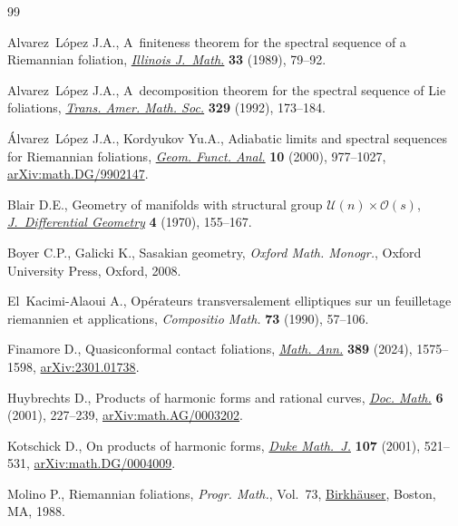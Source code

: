 \begin{thebibliography}{99}
\footnotesize\itemsep=0pt

Alvarez~L\'opez J.A., A~finiteness theorem for the spectral sequence of a
 {R}iemannian foliation,
 \href{https://doi.org/10.1215/ijm/1255988806}{\textit{Illinois J.~Math.}}
 \textbf{33} (1989), 79--92.

Alvarez~L\'opez J.A., A~decomposition theorem for the spectral sequence of
 {L}ie foliations, \href{https://doi.org/10.2307/2154083}{\textit{Trans. Amer.
 Math. Soc.}} \textbf{329} (1992), 173--184.

\'Alvarez~L\'opez J.A., Kordyukov Yu.A., Adiabatic limits and spectral sequences
 for {R}iemannian foliations,
 \href{https://doi.org/10.1007/PL00001653}{\textit{Geom. Funct. Anal.}}
 \textbf{10} (2000), 977--1027,
 \href{http://arxiv.org/abs/math.DG/9902147}{arXiv:math.DG/9902147}.

Blair D.E., Geometry of manifolds with structural group {$ \mathcal{U}(n)\times
 \mathcal{O}(s)$},
 \href{https://doi.org/10.4310/jdg/1214429380}{\textit{J.~Differential
 Geometry}} \textbf{4} (1970), 155--167.

Boyer C.P., Galicki K., Sasakian geometry, \textit{Oxford Math. Monogr.}, Oxford
 University Press, Oxford, 2008.

El~Kacimi-Alaoui A., Op\'erateurs transversalement elliptiques sur un
 feuilletage riemannien et applications, \textit{Compositio Math.} \textbf{73}
 (1990), 57--106.

Finamore D., Quasiconformal contact foliations,
 \href{https://doi.org/10.1007/s00208-023-02687-7}{\textit{Math. Ann.}}
 \textbf{389} (2024), 1575--1598,
 \href{http://arxiv.org/abs/2301.01738}{arXiv:2301.01738}.

Huybrechts D., Products of harmonic forms and rational curves,
 \href{https://doi.org/10.4171/DM/102}{\textit{Doc. Math.}} \textbf{6} (2001),
 227--239, \href{http://arxiv.org/abs/math.AG/0003202}{arXiv:math.AG/0003202}.

Kotschick D., On products of harmonic forms,
 \href{https://doi.org/10.1215/S0012-7094-01-10734-5}{\textit{Duke Math.~J.}}
 \textbf{107} (2001), 521--531,
 \href{http://arxiv.org/abs/math.DG/0004009}{arXiv:math.DG/0004009}.

Molino P., Riemannian foliations, \textit{Progr. Math.}, Vol.~73,
 \href{https://doi.org/10.1007/978-1-4684-8670-4}{Birkh\"auser}, Boston, MA,
 1988.


\end{thebibliography}
